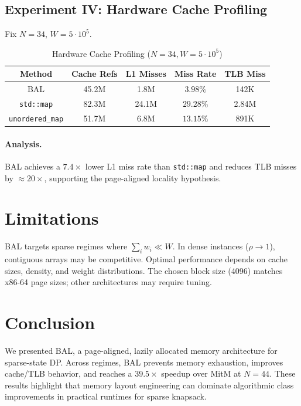 \documentclass[a4paper,USenglish]{lipics-v2021}
\begin{document}
\subsection{Experiment IV: Hardware Cache Profiling}
Fix $N=34$, $W=5\cdot 10^5$.

\begin{table}[t]
\centering
\caption{Hardware Cache Profiling ($N=34, W=5\cdot 10^5$)}
\label{tab:cache}
\begin{tabular}{@{}ccccc@{}}
\toprule
Method & Cache Refs & L1 Misses & Miss Rate & TLB Miss \\
\midrule
BAL & 45.2M & 1.8M & $3.98\%$ & 142K \\
\texttt{std::map} & 82.3M & 24.1M & $29.28\%$ & 2.84M \\
\texttt{unordered\_map} & 51.7M & 6.8M & $13.15\%$ & 891K \\
\bottomrule
\end{tabular}
\end{table}

\paragraph*{Analysis.}
BAL achieves a $7.4\times$ lower L1 miss rate than \texttt{std::map} and reduces TLB misses by $\approx 20\times$, supporting the page-aligned locality hypothesis.

\section{Limitations}
BAL targets sparse regimes where $\sum_i w_i \ll W$. In dense instances ($\rho\to 1$), contiguous arrays may be competitive. Optimal performance depends on cache sizes, density, and weight distributions. The chosen block size (4096) matches x86-64 page sizes; other architectures may require tuning.

\section{Conclusion}
We presented BAL, a page-aligned, lazily allocated memory architecture for sparse-state DP. Across regimes, BAL prevents memory exhaustion, improves cache/TLB behavior, and reaches a $39.5\times$ speedup over MitM at $N=44$. These results highlight that memory layout engineering can dominate algorithmic class improvements in practical runtimes for sparse knapsack.
\end{document}
